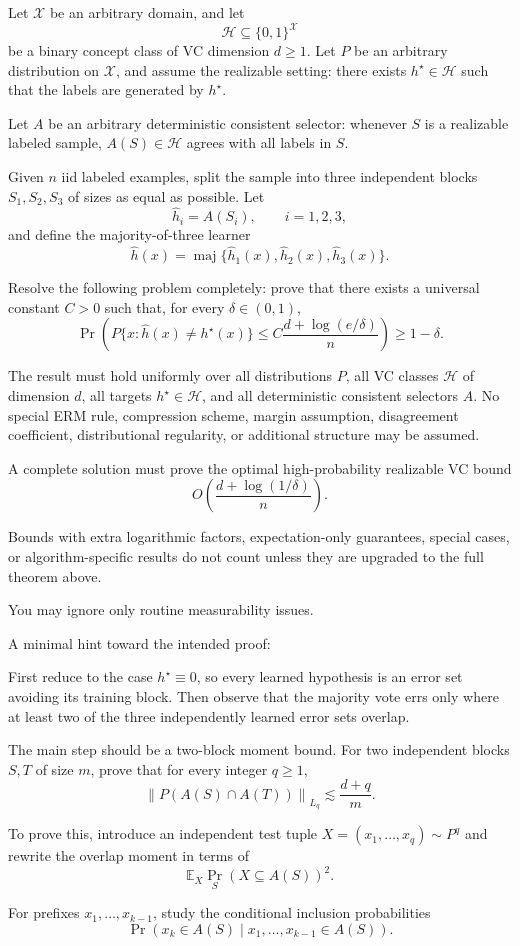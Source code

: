 \documentclass[11pt]{article}
\newcommand{\1}{\mathbf 1}
\theoremstyle{plain}
\theoremstyle{remark}
\begin{document}
\begin{promptbox}
Let \(\mathcal X\) be an arbitrary domain, and let
\[
\mathcal H \subseteq \{0,1\}^{\mathcal X}
\]
be a binary concept class of VC dimension \(d\ge 1\). Let \(P\) be an arbitrary distribution on \(\mathcal X\), and assume the realizable setting: there exists \(h^\star\in\mathcal H\) such that the labels are generated by \(h^\star\).

Let \(A\) be an arbitrary deterministic consistent selector: whenever \(S\) is a realizable labeled sample, \(A(S)\in\mathcal H\) agrees with all labels in \(S\).

Given \(n\) iid labeled examples, split the sample into three independent blocks \(S_1,S_2,S_3\) of sizes as equal as possible. Let
\[
\widehat h_i=A(S_i),\qquad i=1,2,3,
\]
and define the majority-of-three learner
\[
\widehat h(x)
=
\operatorname{maj}\{\widehat h_1(x),\widehat h_2(x),\widehat h_3(x)\}.
\]

Resolve the following problem completely: prove that there exists a universal constant \(C>0\) such that, for every \(\delta\in(0,1)\),
\[
\Pr\left(
P\{x:\widehat h(x)\neq h^\star(x)\}
\le
C\frac{d+\log(e/\delta)}{n}
\right)
\ge 1-\delta .
\]

The result must hold uniformly over all distributions \(P\), all VC classes \(\mathcal H\) of dimension \(d\), all targets \(h^\star\in\mathcal H\), and all deterministic consistent selectors \(A\). No special ERM rule, compression scheme, margin assumption, disagreement coefficient, distributional regularity, or additional structure may be assumed.

A complete solution must prove the optimal high-probability realizable VC bound
\[
O\left(\frac{d+\log(1/\delta)}{n}\right).
\]

Bounds with extra logarithmic factors, expectation-only guarantees, special cases, or algorithm-specific results do not count unless they are upgraded to the full theorem above.

You may ignore only routine measurability issues.

A minimal hint toward the intended proof:

First reduce to the case \(h^\star\equiv 0\), so every learned hypothesis is an error set avoiding its training block. Then observe that the majority vote errs only where at least two of the three independently learned error sets overlap.

The main step should be a two-block moment bound. For two independent blocks \(S,T\) of size \(m\), prove that for every integer \(q\ge 1\),
\[
\left\|P(A(S)\cap A(T))\right\|_{L_q}
\lesssim
\frac{d+q}{m}.
\]

To prove this, introduce an independent test tuple \(X=(x_1,\dots,x_q)\sim P^q\) and rewrite the overlap moment in terms of
\[
\mathbb E_X \Pr_S(X\subseteq A(S))^2.
\]

For prefixes \(x_1,\dots,x_{k-1}\), study the conditional inclusion probabilities
\[
\Pr\left(x_k\in A(S)\mid x_1,\dots,x_{k-1}\in A(S)\right).
\]
\end{promptbox}
\end{document}
